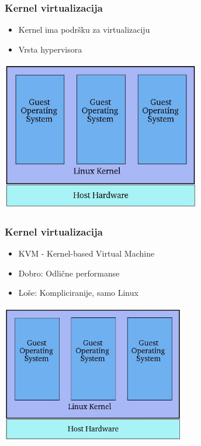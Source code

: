 \documentclass[t]{beamer}
\begin{document}
\begin{frame}
	\frametitle{Kernel virtualizacija}
	\centering
	\begin{itemize}
		\item Kernel ima podršku za virtualizaciju
    \item Vrsta hypervisora
	\end{itemize}
	\includegraphics[width=0.65\textwidth]{kernel_virt.jpg}
\end{frame}

\begin{frame}
	\frametitle{Kernel virtualizacija}
	\centering
	\begin{itemize}
    \item KVM - Kernel-based Virtual Machine
		\item Dobro: Odlične performanse
    \item Loše: Kompliciranije, samo Linux
	\end{itemize}
	\includegraphics[width=0.60\textwidth]{kernel_virt.jpg}
\end{frame}
\end{document}
